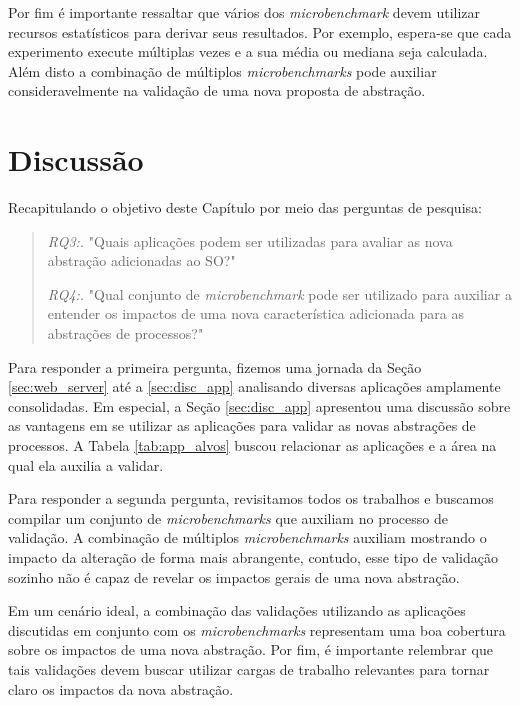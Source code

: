 Por fim é importante ressaltar que vários dos \textit{microbenchmark} devem
utilizar recursos estatísticos para derivar seus resultados. Por exemplo,
espera-se que cada experimento execute múltiplas vezes e a sua média ou mediana
seja calculada. Além disto a combinação de múltiplos \textit{microbenchmarks}
pode auxiliar consideravelmente na validação de uma nova proposta de abstração.

\section{Discussão}

Recapitulando o objetivo deste Capítulo por meio das perguntas de pesquisa:

\begin{quote}
 \item \textit{RQ3:.} "Quais aplicações podem ser utilizadas para avaliar as nova abstração adicionadas ao SO?"
 \item \textit{RQ4:.} "Qual conjunto de \emph{microbenchmark} pode ser utilizado para auxiliar a entender os impactos de uma nova característica adicionada para as abstrações de processos?"
\end{quote}

Para responder a primeira pergunta, fizemos uma jornada da Seção
\ref{sec:web_server} até a \ref{sec:disc_app} analisando diversas aplicações
amplamente consolidadas. Em especial, a Seção \ref{sec:disc_app} apresentou uma
discussão sobre as vantagens em se utilizar as aplicações para validar as novas
abstrações de processos. A Tabela \ref{tab:app_alvos} buscou relacionar as
aplicações e a área na qual ela auxilia a validar.

Para responder a segunda pergunta, revisitamos todos os trabalhos e buscamos
compilar um conjunto de \textit{microbenchmarks} que auxiliam no processo de
validação.  A combinação de múltiplos \textit{microbenchmarks} auxiliam
mostrando o impacto da alteração de forma mais abrangente, contudo, esse tipo
de validação sozinho não é capaz de revelar os impactos gerais de uma nova
abstração.

Em um cenário ideal, a combinação das validações utilizando as aplicações
discutidas em conjunto com os \textit{microbenchmarks} representam uma boa
cobertura sobre os impactos de uma nova abstração. Por fim, é importante
relembrar que tais validações devem buscar utilizar cargas de trabalho
relevantes para tornar claro os impactos da nova abstração.
